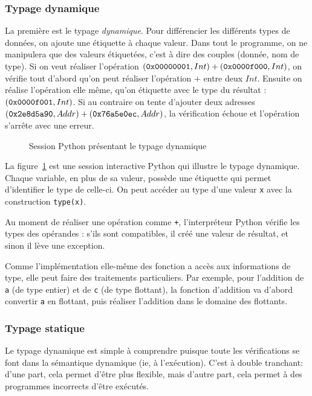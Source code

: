 \subsubsection{Typage dynamique}

La première est le typage \emph{dynamique}. Pour différencier les différents
types de données, on ajoute une étiquette à chaque valeur. Dans tout le
programme, on ne manipulera que des valeurs étiquetées, c'est à dire des couples
(donnée, nom de type). Si on veut réaliser l'opération $(\texttt{0x00000001}, Int) +
(\texttt{0x0000f000}, Int)$, on vérifie tout d'abord qu'on peut réaliser l'opération
$+$ entre deux $Int$. Ensuite on réalise l'opération elle même, qu'on étiquette
avec le type du résultat : $(\texttt{0x0000f001}, Int)$. Si au contraire on tente
d'ajouter deux adresses $(\texttt{0x2e8d5a90}, Addr) + (\texttt{0x76a5e0ec}, Addr)$, la
vérification échoue et l'opération s'arrête avec une erreur.

\begin{figure}
  \caption{Session Python présentant le typage dynamique}
  \label{fig:typage-dynamique}
\end{figure}

La figure~\ref{fig:typage-dynamique} est une session interactive Python qui
illustre le typage dynamique. Chaque variable, en plus de sa valeur, possède une
étiquette qui permet d'identifier le type de celle-ci. On peut accéder au type
d'une valeur \texttt{x} avec la construction \texttt{type(x)}.

Au moment de réaliser une opération comme \texttt{+}, l'interpréteur Python
vérifie les types des opérandes : s'ils sont compatibles, il créé une valeur de
résultat, et sinon il lève une exception.

Comme l'implémentation elle-même des fonction a accès aux informations de type,
elle peut faire des traitements particuliers. Par exemple, pour l'addition de
\texttt{a} (de type entier) et de \texttt{c} (de type flottant), la fonction
d'addition va d'abord convertir \texttt{a} en flottant, puis réaliser l'addition
dans le domaine des flottants.

\subsubsection{Typage statique}

Le typage dynamique est simple à comprendre puisque toute les vérifications se
font dans la sémantique dynamique (ie, à l'exécution). C'est à double tranchant:
d'une part, cela permet d'être plus flexible, mais d'autre part, cela permet à
des programmes incorrects d'être exécutés.

